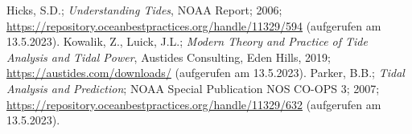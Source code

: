 \begin{thebibliography}{99}

 Hicks, S.D.; \textit{Understanding Tides}, NOAA Report; 2006; 
                  \url{https://repository.oceanbestpractices.org/handle/11329/594} (aufgerufen am 13.5.2023).
 Kowalik, Z., Luick, J.L.; \textit{Modern Theory and Practice of Tide Analysis and
                 Tidal Power}, Austides Consulting, Eden Hills, 2019; \url{https://austides.com/downloads/} 
                 (aufgerufen am 13.5.2023).
 Parker, B.B.; \textit{Tidal Analysis and Prediction}; NOAA Special Publication NOS CO-OPS 3;
                 2007; \url{https://repository.oceanbestpractices.org/handle/11329/632} (aufgerufen am 13.5.2023).                 

\end{thebibliography}

%
